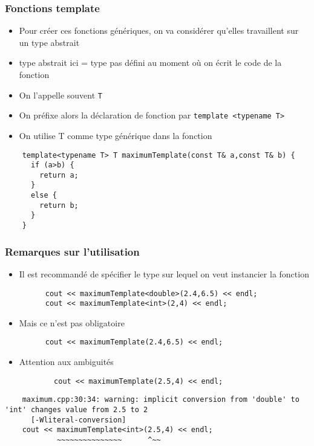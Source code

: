 
\begin{frame}[fragile]\frametitle{Fonctions template}
  \begin{itemize}
    \item Pour créer ces fonctions génériques, on va considérer qu'elles travaillent sur un type abstrait
    \item type abstrait ici = type pas défini au moment où on écrit le code de la fonction
    \item On l'appelle souvent \texttt{T}
    \item On préfixe alors la déclaration de fonction par \texttt{template <typename T>}
    \item On utilise T comme type générique dans la fonction
  \end{itemize}
  \begin{lstlisting}
    template<typename T> T maximumTemplate(const T& a,const T& b) {
      if (a>b) {
        return a;
      }
      else {
        return b;
      }
    }

  \end{lstlisting}
\end{frame}


\begin{frame}[fragile]\frametitle{Remarques sur l'utilisation}
  \begin{itemize}
    \item Il est recommandé de spécifier le type sur lequel on veut instancier la fonction
    \begin{lstlisting}
      cout << maximumTemplate<double>(2.4,6.5) << endl;
      cout << maximumTemplate<int>(2,4) << endl;
    \end{lstlisting}
    \item Mais ce n'est pas obligatoire
    \begin{lstlisting}
      cout << maximumTemplate(2.4,6.5) << endl;
    \end{lstlisting}
      \item Attention aux ambiguités
      \begin{lstlisting}
        cout << maximumTemplate(2.5,4) << endl;
      \end{lstlisting}
  \end{itemize}
  {\tiny \begin{verbatim}
    maximum.cpp:30:34: warning: implicit conversion from 'double' to 'int' changes value from 2.5 to 2
      [-Wliteral-conversion]
    cout << maximumTemplate<int>(2.5,4) << endl;
            ~~~~~~~~~~~~~~~      ^~~
  \end{verbatim}}
\end{frame}

